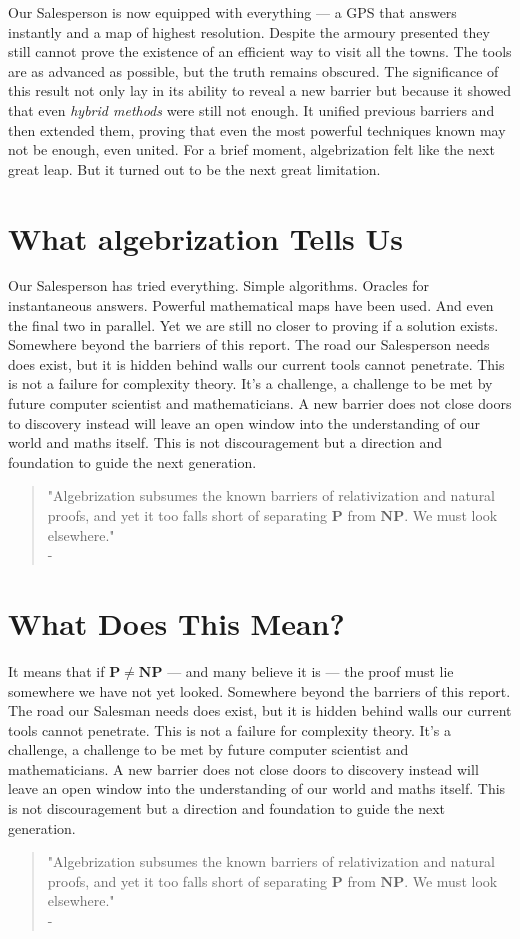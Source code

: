 \documentclass[12pt]{report}
\begin{document}
Our Salesperson is now equipped with everything --- a GPS that answers instantly and a map of highest resolution.
Despite the armoury presented they still cannot prove the existence of an efficient way to visit all the towns.
The tools are as advanced as possible, but the truth remains obscured.
The significance of this result not only lay in its ability to reveal a new barrier but because it showed that even \textit{hybrid methods} were still not enough.
It unified previous barriers and then extended them, proving that even the most powerful techniques known may not be enough, even united.
For a brief moment, algebrization felt like the next great leap.
But it turned out to be the next great limitation.

\section{What algebrization Tells Us}
Our Salesperson has tried everything.
Simple algorithms.
Oracles for instantaneous answers.
Powerful mathematical maps have been used.
And even the final two in parallel.
Yet we are still no closer to proving if a solution exists.
Somewhere beyond the barriers of this report.
The road our Salesperson needs does exist, but it is hidden behind walls our current tools cannot penetrate.
This is not a failure for complexity theory.
It's a challenge, a challenge to be met by future computer scientist and mathematicians.
A new barrier does not close doors to discovery instead will leave an open window into the understanding of our world and maths itself.
This is not discouragement but a direction and foundation to guide the next generation.
\begin{quote}
    "Algebrization subsumes the known barriers of relativization and natural proofs, and yet it too falls short of separating $\mathbf{P}$ from $\mathbf{NP}$. We must look elsewhere."\\
    -\cite{arora2008algebrization}
\end{quote}

\section{What Does This Mean?}
It means that if $\mathbf{P \ne NP}$ --- and many believe it is --- the proof must lie somewhere we have not yet looked.
Somewhere beyond the barriers of this report.
The road our Salesman needs does exist, but it is hidden behind walls our current tools cannot penetrate.
This is not a failure for complexity theory.
It's a challenge, a challenge to be met by future computer scientist and mathematicians.
A new barrier does not close doors to discovery instead will leave an open window into the understanding of our world and maths itself.
This is not discouragement but a direction and foundation to guide the next generation.
\begin{quote}
    "Algebrization subsumes the known barriers of relativization and natural proofs, and yet it too falls short of separating $\mathbf{P}$ from $\mathbf{NP}$. We must look elsewhere."\\
    -\cite{arora2008algebrization}
\end{quote}
\end{document}
